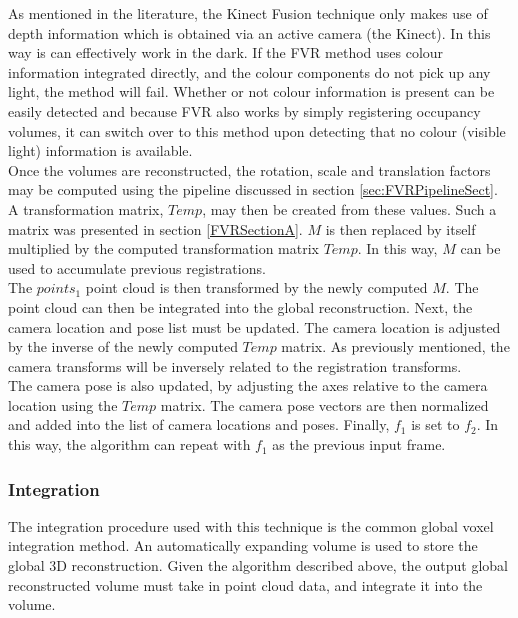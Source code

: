 As mentioned in the literature, the Kinect Fusion technique only makes use of depth information which is obtained via an active camera (the Kinect). In this way is can effectively work in the dark. If the FVR method uses colour information integrated directly, and the colour components do not pick up any light, the method will fail. Whether or not colour information is present can be easily detected and because FVR also works by simply registering occupancy volumes, it can switch over to this method upon detecting that no colour (visible light) information is available. \\

Once the volumes are reconstructed, the rotation, scale and translation factors may be computed using the pipeline discussed in section \ref{sec:FVRPipelineSect}. A transformation matrix, $Temp$, may then be created from these values. Such a matrix was presented in section \ref{FVRSectionA}. $M$ is then replaced by itself multiplied by the computed transformation matrix $Temp$. In this way, $M$ can be used to accumulate previous registrations. \\

The $points_1$ point cloud is then transformed by the newly computed $M$. The point cloud can then be integrated into the global reconstruction. Next, the camera location and pose list must be updated. The camera location is adjusted by the inverse of the newly computed $Temp$ matrix. As previously mentioned, the camera transforms will be inversely related to the registration transforms. \\

The camera pose is also updated, by adjusting the axes relative to the camera location using the $Temp$ matrix. The camera pose vectors are then normalized and added into the list of camera locations and poses. Finally, $f_1$ is set to $f_2$. In this way, the algorithm can repeat with $f_1$ as the previous input frame. \\  



\subsubsection{Integration}

The integration procedure used with this technique is the common global voxel integration method. An automatically expanding volume is used to store the global 3D reconstruction. Given the algorithm described above, the output global reconstructed volume must take in point cloud data, and integrate it into the volume. \\

